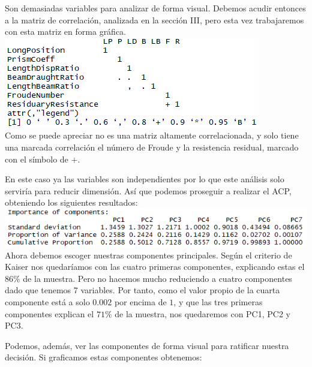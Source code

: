 \documentclass[twoside]{article}
\begin{document}
\begin{multicols}{2}
Son demasiadas variables para analizar de forma visual. Debemos acudir entonces a la matriz de correlaci\'on, analizada en la secci\'on III, pero esta vez trabajaremos con esta matriz en forma gr\'afica.\\

\includegraphics[scale = 0.5]{images/pic_22.png} \\

Como se puede apreciar no es una matriz altamente correlacionada, y solo tiene una marcada correlaci\'on el n\'umero de Froude y la resistencia residual, marcado con el s\'imbolo de $+$. 

En este caso ya las variables son independientes por lo que este an\'alisis solo servir\'ia para reducir dimensi\'on. As\'i que podemos proseguir a realizar el ACP, obteniendo los siguientes resultados:\\

\includegraphics[scale = 0.4]{images/pic_23.png} \\

Ahora debemos escoger nuestras componentes principales. Seg\'un el criterio de Kaiser nos quedar\'iamos con las cuatro primeras componentes, explicando estas el $86\%$ de la muestra. Pero no hacemos mucho reduciendo a cuatro componentes dado que tenemos 7 variables. Por tanto, como el valor propio de la cuarta componente est\'a a solo $0.002$ por encima de $1$, y que las tres primeras componentes explican el $71\%$ de la muestra, nos quedaremos con PC1, PC2 y PC3.

Podemos, adem\'as, ver las componentes de forma visual para ratificar nuestra decisi\'on. Si graficamos estas componentes obtenemos:\\


\end{multicols}
\end{document}
